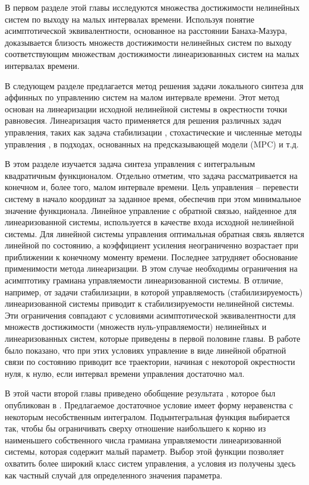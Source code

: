 \documentclass[../main.tex]{subfiles}
\begin{document}
В первом разделе этой главы исследуются множества достижимости нелинейных систем по выходу на малых интервалах времени. Используя понятие асимптотической эквивалентности\cite{Ovs}, основанное на расстоянии Банаха-Мазура, доказывается близость множеств достижимости нелинейных систем по выходу соответствующим множествам достижимости линеаризованных систем на малых интервалах времени. 

В следующем разделе предлагается метод решения задачи локального синтеза для аффинных по управлению систем на малом интервале времени.  
Этот метод основан на линеаризации исходной нелинейной системы в окрестности точки равновесия. 
Линеаризация часто применяется для решения различных задач управления, таких как задача стабилизации \cite{Kras_add,Khalil}, стохастические и численные методы управления \cite{Roxin,EKF,denBerg,Pang}, в подходах, основанных на предсказывающей модели (MPC) \cite{Murillo,LTV_MPC} и т.д.

В этом разделе изучается задача синтеза управления с интегральным квадратичным функционалом. 
Отдельно отметим, что задача рассматривается на конечном и, более того, малом интервале времени. 
Цель управления -- перевести систему в начало координат за заданное время, обеспечив при этом минимальное значение функционала. 
Линейное управление с обратной связью, найденное для линеаризованной системы, используется в качестве входа исходной нелинейной системы. 
Для линейной системы управления оптимальная обратная связь является линейной по состоянию, а коэффициент усиления неограниченно возрастает при приближении к конечному моменту времени. 
Последнее затрудняет обоснование применимости метода линеаризации. 
В этом случае необходимы ограничения на асимптотику грамиана управляемости линеаризованной системы. 
В отличие, например, от задачи стабилизации, в которой управляемость (стабилизируемость) линеаризованной системы приводит к стабилизируемости нелинейной системы. 
Эти ограничения совпадают с условиями асимптотической эквивалентности для множеств достижимости (множеств нуль-управляемости) нелинейных и линеаризованных систем, которые приведены в первой половине главы. 
В работе \cite{GusevOsipov} было показано, что при этих условиях управление в виде линейной обратной связи по состоянию приводит все траектории, начиная с некоторой окрестности нуля, к нулю, если интервал времени управления достаточно мал. 

В этой части второй главы приведено обобщение результата \cite{GusevOsipov}, которое был опубликован в \cite{GusevOsipovMotor}. 
Предлагаемое достаточное условие имеет форму неравенства с некоторым несобственным интегралом. Подынтегральная функция выбирается так, чтобы бы ограничивать сверху отношение  наибольшего к корню из наименьшего собственного числа грамиана управляемости линеаризованной системы, которая содержит малый параметр. 
Выбор этой функции позволяет охватить более широкий класс систем управления, а условия из \cite{GusevOsipov} получены здесь как частный случай для определенного значения параметра.
\end{document}
